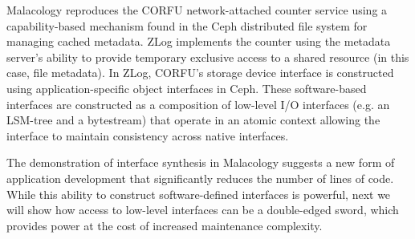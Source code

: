 Malacology reproduces the CORFU network-attached counter service using a
capability-based mechanism found in the Ceph distributed file system for
managing cached metadata. ZLog implements the counter using the metadata server's ability to provide temporary
exclusive access to a shared resource (in this case, file metadata).  In ZLog, CORFU's storage device interface is
constructed using application-specific object interfaces in Ceph. These
software-based interfaces are constructed as a composition of low-level I/O
interfaces (e.g. an LSM-tree and a bytestream) that operate in an atomic
context allowing the interface to maintain consistency across native
interfaces.

The demonstration of interface synthesis in Malacology suggests a new form of
application development that significantly reduces the number of lines of code.
While this ability to construct software-defined interfaces is powerful,
next we will show how access to low-level interfaces can be a double-edged
sword, which provides power at the cost of increased maintenance complexity.
